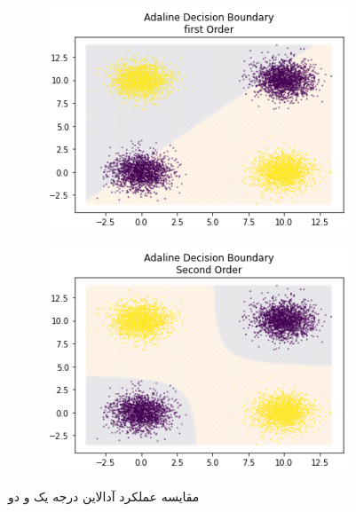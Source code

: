 \documentclass[12pt, a4paper]{article}
\begin{document}
\begin{figure}[h]
    \begin{subfigure}{0.45\linewidth}
        \centering
        \includegraphics[width=\linewidth]{images/6/adaline_first.png}
    \end{subfigure}
    \hfill
    \begin{subfigure}{0.45\linewidth}
        \centering
        \includegraphics[width=\linewidth]{images/6/adaline_sec.png}
    \end{subfigure}
    \caption{مقایسه عملکرد آدالاین درجه یک و دو}
\end{figure}
\end{document}
